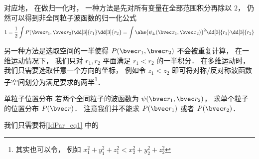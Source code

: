 对应地， 在做归一化时， 一种方法是先对所有变量在全部范围积分再除以 $2$， 仍然可以得到非全同粒子波函数的归一化公式
\begin{equation}
1 = \frac{1}{2}\int P(\bvec r_1, \bvec r_2) \dd[3]{r_1}\dd[3]{r_2} = \int \abs{\psi_\pm(\bvec x_1, \bvec x_2)}^2 \dd[3]{r_1}\dd[3]{r_2}
\end{equation}

另一种方法是选取空间的一半使得 $P(\bvec r_1, \bvec r_2)$ 不会被重复计算， 在一维运动情况下， 我们只对 $r_1, r_2$ 平面满足 $r_1 < r_2$ 的一半积分． 在多维运动时， 我们只需要选取任意一个方向的坐标， 例如令 $z_1 < z_2$ 即可将对称/反对称波函数子空间划分为满足要求的两半\footnote{其实也可以令， 例如 $x_1^2 + y_1^2 + z_1^2 < x_2^2 + y_2^2 + z_2^2$}．

\begin{example}{单粒子位置分布}
若两个全同粒子的波函数为 $\psi(\bvec r_1,\bvec r_2)$， 求单个粒子的位置分布 $P(\bvec r)$． 注意我们并不能求 $P(\bvec r_1)$ 或者 $P(\bvec r_2)$．

我们只需要将\autoref{IdPar_eq1} 中的
\end{example}
